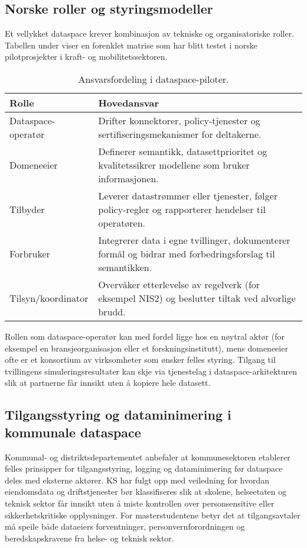 \subsection{Norske roller og styringsmodeller}
Et vellykket dataspace krever kombinasjon av tekniske og organisatoriske roller. Tabellen under viser en forenklet matrise som
har blitt testet i norske pilotprosjekter i kraft- og mobilitetssektoren.

\begin{table}[ht]
    \centering
    \caption{Ansvarsfordeling i dataspace-piloter.}
    \label{tab:kap03-dataspace-ansvar}
    \begin{tabular}{p{}p{}}
        \toprule
        \textbf{Rolle} & \textbf{Hovedansvar} \\
        \midrule
        Dataspace-operatør & Drifter konnektorer, policy-tjenester og sertifiseringsmekanismer for deltakerne. \\
        Domeneeier & Definerer semantikk, datasettprioritet og kvalitetssikrer modellene som bruker informasjonen. \\
        Tilbyder & Leverer datastrømmer eller tjenester, følger policy-regler og rapporterer hendelser til operatøren. \\
        Forbruker & Integrerer data i egne tvillinger, dokumenterer formål og bidrar med forbedringsforslag til semantikken. \\
        Tilsyn/koordinator & Overvåker etterlevelse av regelverk (for eksempel NIS2) og beslutter tiltak ved alvorlige brudd. \\
        \bottomrule
    \end{tabular}
\end{table}

Rollen som dataspace-operatør kan med fordel ligge hos en nøytral aktør (for eksempel en bransjeorganisasjon eller et
forskningsinstitutt), mens domeneeier ofte er et konsortium av virksomheter som ønsker felles styring. Tilgang til tvillingens
simuleringsresultater kan skje via tjenestelag i dataspace-arkitekturen slik at partnerne får innsikt uten å kopiere hele
datasett.

\subsection{Tilgangsstyring og dataminimering i kommunale dataspace}
Kommunal- og distriktsdepartementet anbefaler at kommunesektoren etablerer felles prinsipper for tilgangsstyring, logging og
dataminimering før dataspace deles med eksterne aktører.\citep{kdd2023datadeling} KS har fulgt opp med veiledning for hvordan
eiendomsdata og driftstjenester bør klassifiseres slik at skolene, helseetaten og teknisk sektor får innsikt uten å miste
kontrollen over personsensitive eller sikkerhetskritiske opplysninger.\citep{ks2024eiendomsdrift} For masterstudentene betyr
det at tilgangsavtaler må speile både dataeiers forventninger, personvernforordningen og beredskapskravene fra helse- og
teknisk sektor.

